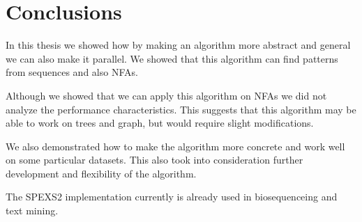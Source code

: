 
\chapter{Conclusions}









In this thesis we showed how by making an algorithm more abstract and
general we can also make it parallel. We showed that this algorithm
can find patterns from sequences and also NFAs.

Although we showed that we can apply this algorithm on NFAs we did
not analyze the performance characteristics. This suggests that this 
algorithm may be able to work on trees and graph, but would 
require slight modifications.

We also demonstrated how to make the algorithm more concrete 
and work well on some particular datasets. This also took into 
consideration further development and flexibility of the algorithm.

The SPEXS2 implementation currently is already used in biosequenceing
and text mining.
